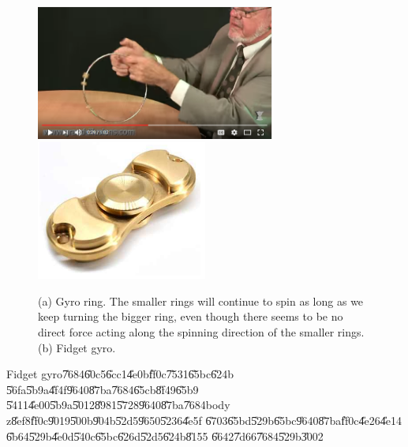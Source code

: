 \begin{figure}[th]
\caption{(a) Gyro ring. The smaller rings will continue to spin as long as
we keep turning the bigger ring, even though there seems to be no direct
force acting along the spinning direction of the smaller rings. (b) Fidget
gyro.}
\label{gyro_fidget_rings}
\begin{center}
\includegraphics[width=0.7\textwidth]{./figs/gyro_ring.png} %
\includegraphics[width=0.5\textwidth]{./figs/fidget_gyro.png}
\end{center}
\end{figure}

\bigskip

Fidget gyro\U{7684}\U{60c5}\U{6cc1}\U{4e0b}\U{ff0c}\U{7531}\U{65bc}\U{624b}%
\U{56fa}\U{5b9a}\U{4f4f}\U{9640}\U{87ba}\U{7684}\U{65cb}\U{8f49}\U{65b9}%
\U{5411}\U{4e00}\U{5b9a}\U{5012}\U{8981}\U{5728}\U{9640}\U{87ba}\U{7684}body
z\U{8ef8}\U{ff0c}\U{9019}\U{500b}\U{904b}\U{52d5}\U{9650}\U{5236}\U{4e5f}%
\U{6703}\U{65bd}\U{529b}\U{65bc}\U{9640}\U{87ba}\U{ff0c}\U{4e26}\U{4e14}%
\U{6b64}\U{529b}\U{4e0d}\U{540c}\U{65bc}\U{626d}\U{52d5}\U{624b}\U{8155}%
\U{6642}\U{7d66}\U{7684}\U{529b}\U{3002}

\bigskip

